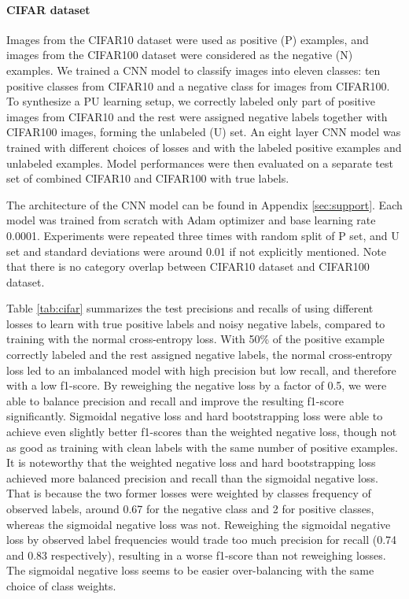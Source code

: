 \paragraph{CIFAR dataset}

Images from the CIFAR10 dataset were used as positive (P) examples, and images from the CIFAR100 dataset were considered as the negative (N) examples.
We trained a CNN model to classify images into eleven classes: ten positive classes from CIFAR10 and a negative class for images from CIFAR100.
To synthesize a PU learning setup, we correctly labeled only part of positive images from CIFAR10 and the rest were assigned negative labels together with CIFAR100 images, forming the unlabeled (U) set.
An eight layer CNN model was trained with different choices of losses and with the labeled positive examples and unlabeled examples.
Model performances were then evaluated on a separate test set of combined CIFAR10 and CIFAR100 with true labels.

The architecture of the CNN model can be found in Appendix \ref{sec:support}.
Each model was trained from scratch with Adam optimizer and base learning rate 0.0001.
Experiments were repeated three times with random split of P set, and U set and standard deviations were around 0.01 if not explicitly mentioned.
Note that there is no category overlap between CIFAR10 dataset and CIFAR100 dataset.


Table \ref{tab:cifar} summarizes the test precisions and recalls of using different losses to learn with true positive labels and noisy negative labels, compared to training with the normal cross-entropy loss.
With 50\% of the positive example correctly labeled and the rest assigned negative labels, the normal cross-entropy loss led to an imbalanced model with high precision but low recall, and therefore with a low f1-score.
By reweighing the negative loss by a factor of 0.5, we were able to balance precision and recall and improve the resulting f1-score significantly.
Sigmoidal negative loss and hard bootstrapping loss were able to achieve even slightly better f1-scores than the weighted negative loss, though not as good as training with clean labels with the same number of positive examples.
It is noteworthy that the weighted negative loss and hard bootstrapping loss achieved more balanced precision and recall than the sigmoidal negative loss.
That is because the two former losses were weighted by classes frequency of observed labels, around 0.67 for the negative class and 2 for positive classes, whereas the sigmoidal negative loss was not.
Reweighing the sigmoidal negative loss by observed label frequencies would trade too much precision for recall (0.74 and 0.83 respectively), resulting in a worse f1-score than not reweighing losses.
The sigmoidal negative loss seems to be easier over-balancing with the same choice of class weights.


